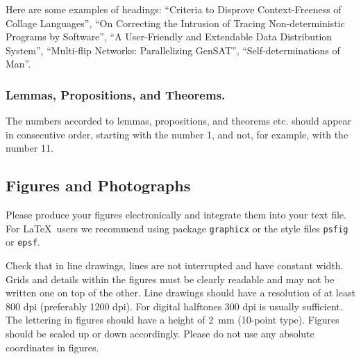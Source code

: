 \documentclass[runningheads]{llncs}
\begin{document}
Here are
some examples of headings: ``Criteria to Disprove Context-Freeness of
Collage Languages'', ``On Correcting the Intrusion of Tracing
Non-deterministic Programs by Software'', ``A User-Friendly and
Extendable Data Distribution System'', ``Multi-flip Networks:
Parallelizing GenSAT'', ``Self-determinations of Man''.

\subsubsection{Lemmas, Propositions, and Theorems.}

The numbers accorded to lemmas, propositions, and theorems etc. should
appear in consecutive order, starting with the number 1, and not, for
example, with the number 11.

\subsection{Figures and Photographs}
\label{sect:figures}

Please produce your figures electronically and integrate
them into your text file. For \LaTeX\ users we recommend using package
\verb+graphicx+ or the style files \verb+psfig+ or \verb+epsf+.

Check that in line drawings, lines are not
interrupted and have constant width. Grids and details within the
figures must be clearly readable and may not be written one on top of
the other. Line drawings should have a resolution of at least 800 dpi
(preferably 1200 dpi).
For digital halftones 300 dpi is usually sufficient.
The lettering in figures should have a height of 2~mm (10-point type).
Figures should be scaled up or down accordingly.
Please do not use any absolute coordinates in figures.
\end{document}
